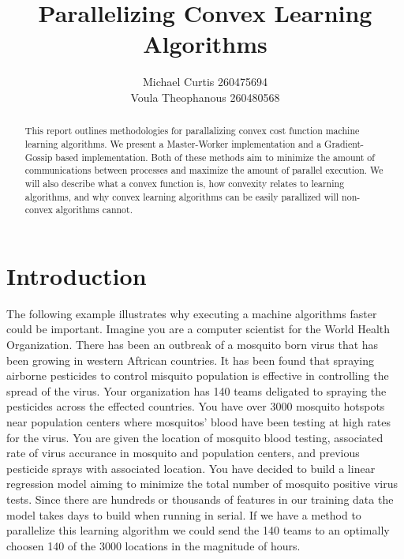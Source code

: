 \documentclass{article}
\begin{document}
\title{Parallelizing Convex Learning Algorithms}
\author{Michael Curtis 260475694\\
Voula Theophanous 260480568}
\maketitle

\begin{abstract}

This report outlines methodologies for parallalizing convex cost function machine learning algorithms. We present a Master-Worker implementation and a Gradient-Gossip based implementation. Both of these methods aim to minimize the amount of communications between processes and maximize the amount of parallel execution. We will also describe what a convex function is, how convexity relates to learning algorithms, and why convex learning algorithms can be easily parallized will non-convex algorithms cannot.

\end{abstract}

\section{Introduction}
The following example illustrates why executing a machine algorithms faster could be important. Imagine you are a computer scientist for the World Health Organization. There has been an outbreak of a mosquito born virus that has been growing in western Aftrican countries. It has been found that spraying airborne pesticides to control misquito population is effective in controlling the spread of the virus. Your organization has 140 teams deligated to spraying the pesticides across the effected countries. You have over 3000 mosquito hotspots near population centers where mosquitos' blood have been testing at high rates for the virus. You are given the location of mosquito blood testing, associated rate of virus accurance in mosquito and population centers, and previous pesticide sprays with associated location. You have decided to build a linear regression model aiming to minimize the total number of mosquito positive virus tests. Since there are hundreds or thousands of features in our training data the model takes days to build when running in serial. If we have a method to parallelize this learning algorithm we could send the 140 teams to an optimally choosen 140 of the 3000 locations in the magnitude of hours.
\end{document}
